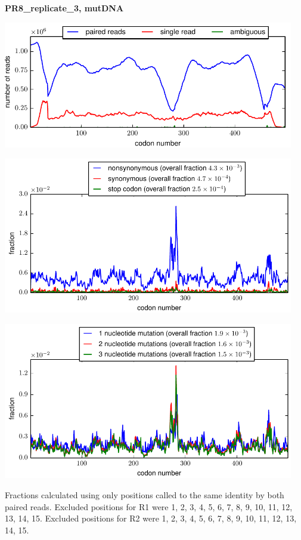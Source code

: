 \documentclass[10pt,letterpaper]{article}
\begin{document}
\centerline{\Large \bf PR8\_replicate\_3, mutDNA}
\vspace{0.1in}

\centerline{\includegraphics[width=5in]{PR8_replicate_3_mutDNA_codondepth.pdf}}
\vspace{0.1in}

\centerline{\includegraphics[width=5in]{PR8_replicate_3_mutDNA_syn-ns-dist.pdf}}
\vspace{0.1in}

\centerline{\includegraphics[width=5in]{PR8_replicate_3_mutDNA_nmutspercodon-dist.pdf}}
\vspace{0.1in}

Fractions calculated using only positions called to the same identity by both paired reads.  Excluded positions for R1 were 1, 2, 3, 4, 5, 6, 7, 8, 9, 10, 11, 12, 13, 14, 15. 
 Excluded positions for R2 were 1, 2, 3, 4, 5, 6, 7, 8, 9, 10, 11, 12, 13, 14, 15. 
\end{document}
